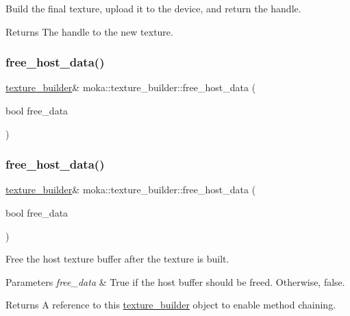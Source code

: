 Build the final texture, upload it to the device, and return the handle. 

\begin{DoxyReturn}{Returns}
The handle to the new texture. 
\end{DoxyReturn}
\mbox{\label{classmoka_1_1texture__builder_a64f4ead902072e54312ea7d4a7d290bd}} 
\subsubsection{\texorpdfstring{free\_host\_data()}{free\_host\_data()}\hspace{0.1cm}{\footnotesize\ttfamily [1/2]}}
{\footnotesize\ttfamily \mbox{\hyperlink{classmoka_1_1texture__builder}{texture\+\_\+builder}}\& moka\+::texture\+\_\+builder\+::free\+\_\+host\+\_\+data (\begin{DoxyParamCaption}\item[{bool}]{free\+\_\+data }\end{DoxyParamCaption})}

\mbox{\label{classmoka_1_1texture__builder_a64f4ead902072e54312ea7d4a7d290bd}} 
\subsubsection{\texorpdfstring{free\_host\_data()}{free\_host\_data()}\hspace{0.1cm}{\footnotesize\ttfamily [2/2]}}
{\footnotesize\ttfamily \mbox{\hyperlink{classmoka_1_1texture__builder}{texture\+\_\+builder}}\& moka\+::texture\+\_\+builder\+::free\+\_\+host\+\_\+data (\begin{DoxyParamCaption}\item[{bool}]{free\+\_\+data }\end{DoxyParamCaption})}



Free the host texture buffer after the texture is built. 


\begin{DoxyParams}{Parameters}
{\em free\+\_\+data} & True if the host buffer should be freed. Otherwise, false. \\
\hline
\end{DoxyParams}
\begin{DoxyReturn}{Returns}
A reference to this \mbox{\hyperlink{classmoka_1_1texture__builder}{texture\+\_\+builder}} object to enable method chaining. 
\end{DoxyReturn}
\mbox{\label{classmoka_1_1texture__builder_a08398bb398d3b35e1ecd7a669b3fd792}} 
